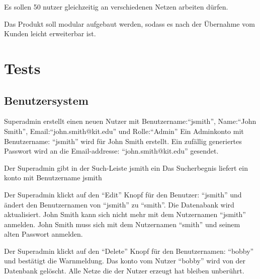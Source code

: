 \documentclass[parskip=full,11pt,twoside]{scrartcl}
\begin{document}

Es sollen 50 \Gls{nutzer} gleichzeitig an verschiedenen Netzen arbeiten dürfen. 


Das Produkt soll \gls{modular} aufgebaut werden, sodass es nach der Übernahme vom Kunden leicht erweiterbar ist. 

\section{Tests}


\subsection{Benutzersystem}


{Superadmin erstellt einen neuen Nutzer mit Benutzername:\enquote{jsmith}, Name:\enquote{John Smith}, Email:\enquote{john.smith@kit.edu} und Rolle:\enquote{Admin}}
{Ein Adminkonto mit Benutzername: \enquote{jsmith} wird für John Smith erstellt. Ein zufällig generiertes Passwort wird an die Email-addresse: \enquote{john.smith@kit.edu} gesendet.}

{Der Superadmin gibt in der Such-Leiste jsmith ein}
{Das Sucherbegnis liefert ein \Gls{konto} mit Benutzername jsmith}

{Der Superadmin klickt auf den \enquote{Edit} Knopf für den Benutzer: \enquote{jsmith} und ändert den Benutzernamen von \enquote{jsmith} zu \enquote{smith}.}
{Die Datenabank wird aktualisiert. John Smith kann sich nicht mehr mit dem Nutzernamen \enquote{jsmith} anmelden. John Smith muss sich mit dem Nutzernamen \enquote{smith} und seinem alten Passwort anmelden.}

{Der Superadmin klickt auf den \enquote{Delete} Knopf für den Benutzernamen: \enquote{bobby} und bestätigt die Warnmeldung.}
{Das \Gls{konto} vom Nutzer \enquote{bobby} wird von der Datenbank gelöscht. Alle Netze die der Nutzer erzeugt hat bleiben unberührt.}
\end{document}
